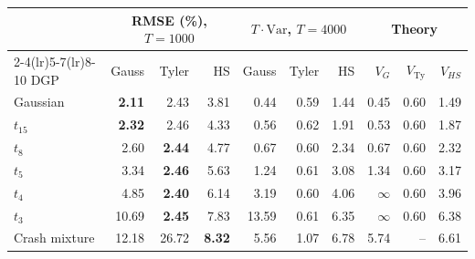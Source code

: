 \begin{tabular}{lrrrrrrrrr}
\toprule
 & \multicolumn{3}{c}{RMSE (\%), $T=1000$} & \multicolumn{3}{c}{$T\cdot\mathrm{Var}$, $T=4000$} & \multicolumn{3}{c}{Theory} \\
\cmidrule(lr){2-4}\cmidrule(lr){5-7}\cmidrule(lr){8-10}
DGP & Gauss & Tyler & HS & Gauss & Tyler & HS & $V_G$ & $V_{\mathrm{Ty}}$ & $V_{HS}$ \\
\midrule
Gaussian & \textbf{2.11} & 2.43 & 3.81 & 0.44 & 0.59 & 1.44 & 0.45 & 0.60 & 1.49 \\
$t_{15}$ & \textbf{2.32} & 2.46 & 4.33 & 0.56 & 0.62 & 1.91 & 0.53 & 0.60 & 1.87 \\
$t_8$ & 2.60 & \textbf{2.44} & 4.77 & 0.67 & 0.60 & 2.34 & 0.67 & 0.60 & 2.32 \\
$t_5$ & 3.34 & \textbf{2.46} & 5.63 & 1.24 & 0.61 & 3.08 & 1.34 & 0.60 & 3.17 \\
$t_4$ & 4.85 & \textbf{2.40} & 6.14 & 3.19 & 0.60 & 4.06 & $\infty$ & 0.60 & 3.96 \\
$t_3$ & 10.69 & \textbf{2.45} & 7.83 & 13.59 & 0.61 & 6.35 & $\infty$ & 0.60 & 6.38 \\
Crash mixture & 12.18 & 26.72 & \textbf{8.32} & 5.56 & 1.07 & 6.78 & 5.74 & -- & 6.61 \\
\bottomrule
\end{tabular}